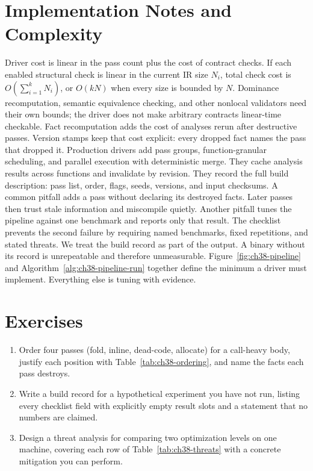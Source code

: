 \section{Implementation Notes and Complexity}\label{sec:ch38-implementation}

Driver cost is linear in the pass count plus the cost of contract checks.
If each enabled structural check is linear in the current IR size $N_i$, total check cost is $O(\sum_{i=1}^{k}N_i)$, or $O(kN)$ when every size is bounded by $N$.
Dominance recomputation, semantic equivalence checking, and other nonlocal validators need their own bounds; the driver does not make arbitrary contracts linear-time checkable.
Fact recomputation adds the cost of analyses rerun after destructive passes.
Version stamps keep that cost explicit: every dropped fact names the pass that dropped it.
Production drivers add pass groups, function-granular scheduling, and parallel execution with deterministic merge.
They cache analysis results across functions and invalidate by revision.
They record the full build description: pass list, order, flags, seeds, versions, and input checksums.
A common pitfall adds a pass without declaring its destroyed facts.
Later passes then trust stale information and miscompile quietly.
Another pitfall tunes the pipeline against one benchmark and reports only that result.
The checklist prevents the second failure by requiring named benchmarks, fixed repetitions, and stated threats.
We treat the build record as part of the output.
A binary without its record is unrepeatable and therefore unmeasurable.
Figure~\ref{fig:ch38-pipeline} and Algorithm~\ref{alg:ch38-pipeline-run} together define the minimum a driver must implement.
Everything else is tuning with evidence.

\section{Exercises}\label{sec:ch38-exercises}

\begin{enumerate}
\item Order four passes (fold, inline, dead-code, allocate) for a call-heavy body, justify each position with Table~\ref{tab:ch38-ordering}, and name the facts each pass destroys.\label{ex:ch38-order-passes}
\item Write a build record for a hypothetical experiment you have not run, listing every checklist field with explicitly empty result slots and a statement that no numbers are claimed.\label{ex:ch38-record-empty}
\item Design a threat analysis for comparing two optimization levels on one machine, covering each row of Table~\ref{tab:ch38-threats} with a concrete mitigation you can perform.\label{ex:ch38-threat-plan}
\end{enumerate}

